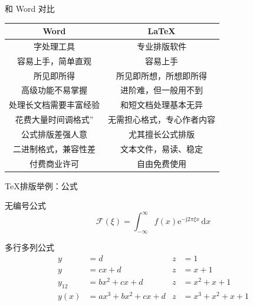 \documentclass[xcolor=table,dvipsnames,svgnames]{beamer}
\begin{document}
\begin{frame}{和 Word 对比}
  \begin{table}[h]
    \centering
    \begin{tabular}{c|c}
      Word & \LaTeX \\
      \hline
      字处理工具 & 专业排版软件 \\
      容易上手，简单直观 & 容易上手 \\
      所见即所得 & 所见即所想，所想即所得 \\
      高级功能不易掌握 & 进阶难，但一般用不到 \\
      处理长文档需要丰富经验 & 和短文档处理基本无异 \\
      花费大量时间调格式'' & 无需担心格式，专心作者内容 \\
      公式排版差强人意 & 尤其擅长公式排版 \\
      二进制格式，兼容性差 & 文本文件，易读、稳定 \\
      付费商业许可 & 自由免费使用 \\
    \end{tabular}
  \end{table}
\end{frame}

\begin{frame}{\TeX{}排版举例：公式}
  \begin{exampleblock}{无编号公式}
  \begin{equation*}
    \mathcal{F}(\xi)=\int_{-\infty}^{\infty}
    f(x)\mathrm{e}^{-\mathrm{j}2\pi \xi x}\,\mathrm{d}x
  \end{equation*}
  \end{exampleblock}
  \begin{exampleblock}{多行多列公式}
\begin{align}
	y & =d & z & =1\\
	y & =cx+d & z & =x+1\\
	y_{12} & =bx^{2}+cx+d & z & =x^{2}+x+1\nonumber \\
	y(x) & =ax^{3}+bx^{2}+cx+d & z & =x^{3}+x^{2}+x+1
\end{align}
  \end{exampleblock}
\end{frame}
\end{document}
